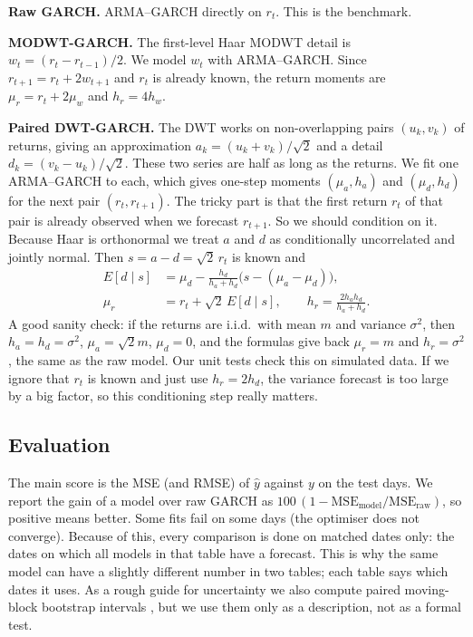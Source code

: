 \documentclass{article}
\begin{document}
\textbf{Raw GARCH.} ARMA--GARCH directly on $r_t$. This is the benchmark.

\textbf{MODWT-GARCH.} The first-level Haar MODWT detail is $w_t=(r_t-r_{t-1})/2$. We model $w_t$ with ARMA--GARCH. Since $r_{t+1}=r_t+2w_{t+1}$ and $r_t$ is already known, the return moments are $\mu_r=r_t+2\mu_w$ and $h_r=4h_w$.

\textbf{Paired DWT-GARCH.} The DWT works on non-overlapping pairs $(u_k,v_k)$ of returns, giving an approximation $a_k=(u_k+v_k)/\sqrt2$ and a detail $d_k=(v_k-u_k)/\sqrt2$. These two series are half as long as the returns. We fit one ARMA--GARCH to each, which gives one-step moments $(\mu_a,h_a)$ and $(\mu_d,h_d)$ for the next pair $(r_t,r_{t+1})$. The tricky part is that the first return $r_t$ of that pair is already observed when we forecast $r_{t+1}$. So we should condition on it. Because Haar is orthonormal we treat $a$ and $d$ as conditionally uncorrelated and jointly normal. Then $s=a-d=\sqrt2\,r_t$ is known and
\begin{align}
E[d\mid s]&=\mu_d-\frac{h_d}{h_a+h_d}\bigl(s-(\mu_a-\mu_d)\bigr),\\
\mu_r&=r_t+\sqrt2\,E[d\mid s],\qquad h_r=\frac{2h_ah_d}{h_a+h_d}.
\end{align}
A good sanity check: if the returns are i.i.d.\ with mean $m$ and variance $\sigma^2$, then $h_a=h_d=\sigma^2$, $\mu_a=\sqrt2m$, $\mu_d=0$, and the formulas give back $\mu_r=m$ and $h_r=\sigma^2$, the same as the raw model. Our unit tests check this on simulated data. If we ignore that $r_t$ is known and just use $h_r=2h_d$, the variance forecast is too large by a big factor, so this conditioning step really matters.

\subsection{Evaluation}

The main score is the MSE (and RMSE) of $\hat y$ against $y$ on the test days. We report the gain of a model over raw GARCH as $100\,(1-\mathrm{MSE}_{\text{model}}/\mathrm{MSE}_{\text{raw}})$, so positive means better. Some fits fail on some days (the optimiser does not converge). Because of this, every comparison is done on matched dates only: the dates on which all models in that table have a forecast. This is why the same model can have a slightly different number in two tables; each table says which dates it uses. As a rough guide for uncertainty we also compute paired moving-block bootstrap intervals \cite{kunsch1989}, but we use them only as a description, not as a formal test.
\end{document}
